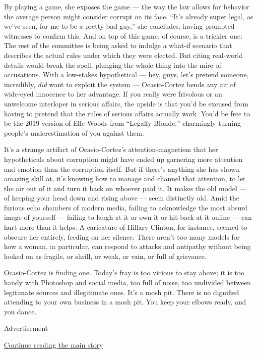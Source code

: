 By playing a game, she exposes the game --- the way the law allows for
behavior the average person might consider corrupt on its face. ``It's
already super legal, as we've seen, for me to be a pretty bad guy,'' she
concludes, having prompted witnesses to confirm this. And on top of this
game, of course, is a trickier one: The rest of the committee is being
asked to indulge a what-if scenario that describes the actual rules
under which they were elected. But citing real-world details would break
the spell, plunging the whole thing into the mire of accusations. With a
low-stakes hypothetical --- hey, guys, let's pretend someone,
incredibly, \emph{did} want to exploit the system --- Ocasio-Cortez
bends any air of wide-eyed innocence to her advantage. If you really
were frivolous or an unwelcome interloper in serious affairs, the upside
is that you'd be excused from having to pretend that the rules of
serious affairs actually work. You'd be free to be the 2019 version of
Elle Woods from ``Legally Blonde,'' charmingly turning people's
underestimation of you against them.

It's a strange artifact of Ocasio-Cortez's attention-magnetism that her
hypotheticals about corruption might have ended up garnering more
attention and emotion than the corruption itself. But if there's
anything she has shown amazing skill at, it's knowing how to manage and
channel that attention, to let the air out of it and turn it back on
whoever paid it. It makes the old model --- of keeping your head down
and rising above --- seem distinctly old. Amid the furious echo chambers
of modern media, failing to acknowledge the most absurd image of
yourself --- failing to laugh at it or own it or hit back at it online
--- can hurt more than it helps. A caricature of Hillary Clinton, for
instance, seemed to obscure her entirely, feeding on her silence. There
aren't too many models for how a woman, in particular, can respond to
attacks and antipathy without being looked on as fragile, or shrill, or
weak, or vain, or full of grievance.

Ocasio-Cortez is finding one. Today's fray is too vicious to stay above;
it is too handy with Photoshop and social media, too full of noise, too
undivided between legitimate sources and illegitimate ones. It's a mosh
pit. There is no dignified attending to your own business in a mosh pit.
You keep your elbows ready, and you dance.

Advertisement

\protect\hyperlink{after-bottom}{Continue reading the main story}

